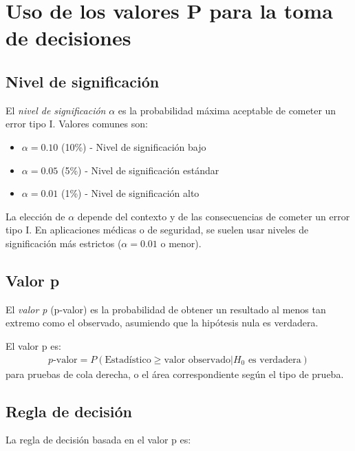 \section{Uso de los valores P para la toma de decisiones}

\subsection{Nivel de significación}

El \emph{nivel de significación} $\alpha$ es la probabilidad máxima aceptable de cometer un error tipo I. Valores comunes son:
\begin{itemize}
	\item $\alpha = 0.10$ (10\%) - Nivel de significación bajo
	\item $\alpha = 0.05$ (5\%) - Nivel de significación estándar
	\item $\alpha = 0.01$ (1\%) - Nivel de significación alto
\end{itemize}

\begin{observacion}
	La elección de $\alpha$ depende del contexto y de las consecuencias de cometer un error tipo I. En aplicaciones médicas o de seguridad, se suelen usar niveles de significación más estrictos ($\alpha = 0.01$ o menor).
\end{observacion}

\subsection{Valor p}

El \emph{valor p} (p-valor) es la probabilidad de obtener un resultado al menos tan extremo como el observado, asumiendo que la hipótesis nula es verdadera.

\begin{definicion}[Valor p]
	El valor p es:
	\begin{align}
		p\text{-valor} = P(\text{Estadístico} \geq \text{valor observado} | H_0 \text{ es verdadera})
	\end{align}
	para pruebas de cola derecha, o el área correspondiente según el tipo de prueba.
\end{definicion}

\subsection{Regla de decisión}

La regla de decisión basada en el valor p es:

